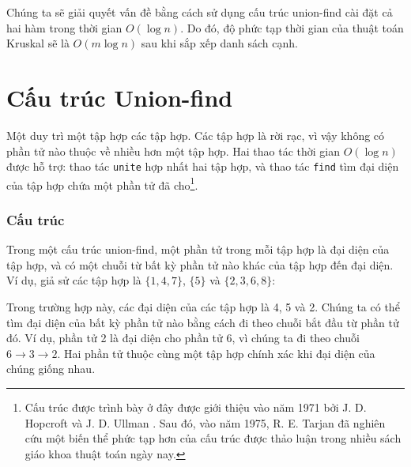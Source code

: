 Chúng ta sẽ giải quyết vấn đề bằng cách sử dụng cấu trúc union-find
cài đặt cả hai hàm trong thời gian $O(\log n)$.
Do đó, độ phức tạp thời gian của thuật toán Kruskal
sẽ là $O(m \log n)$ sau khi sắp xếp danh sách cạnh.

\section{Cấu trúc Union-find}


Một  duy trì
một tập hợp các tập hợp.
Các tập hợp là rời rạc, vì vậy không có phần tử nào
thuộc về nhiều hơn một tập hợp.
Hai thao tác thời gian $O(\log n)$ được hỗ trợ:
thao tác \texttt{unite} hợp nhất hai tập hợp,
và thao tác \texttt{find} tìm đại diện
của tập hợp chứa một phần tử đã cho\footnote{Cấu trúc được trình bày ở đây
được giới thiệu vào năm 1971 bởi J. D. Hopcroft và J. D. Ullman \cite{hop71}.
Sau đó, vào năm 1975, R. E. Tarjan đã nghiên cứu một biến thể phức tạp hơn
của cấu trúc \cite{tar75} được thảo luận trong nhiều sách giáo khoa thuật toán
ngày nay.}.

\subsubsection{Cấu trúc}

Trong một cấu trúc union-find, một phần tử trong mỗi tập hợp
là đại diện của tập hợp,
và có một chuỗi từ bất kỳ phần tử nào khác của
tập hợp đến đại diện.
Ví dụ, giả sử các tập hợp là
$\{1,4,7\}$, $\{5\}$ và $\{2,3,6,8\}$:
\begin{center}
\end{center}
Trong trường hợp này, các đại diện
của các tập hợp là 4, 5 và 2.
Chúng ta có thể tìm đại diện của bất kỳ phần tử nào
bằng cách đi theo chuỗi bắt đầu từ phần tử đó.
Ví dụ, phần tử 2 là đại diện
cho phần tử 6, vì
chúng ta đi theo chuỗi $6 \rightarrow 3 \rightarrow 2$.
Hai phần tử thuộc cùng một tập hợp chính xác khi
đại diện của chúng giống nhau.

